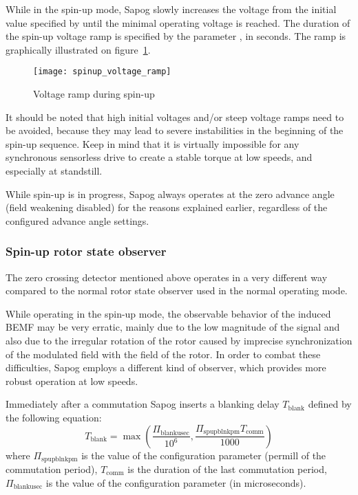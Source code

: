 \documentclass{zubaxdoc}
\begin{document}
	While in the spin-up mode, Sapog slowly increases the voltage from the initial value specified
	by  until the minimal operating voltage  is reached.
	The duration of the spin-up voltage ramp is specified by the parameter ,
	in seconds.
	The ramp is graphically illustrated on figure~\ref{spinup_voltage_ramp}.
	
	\begin{figure}[hbt]
		\centering
		\texttt{[image: spinup\_voltage\_ramp]}
		\caption{Voltage ramp during spin-up
			\label{spinup_voltage_ramp}}
	\end{figure}
	
	It should be noted that high initial voltages and/or steep voltage ramps need to be avoided,
	because they may lead to severe instabilities in the beginning of the spin-up sequence.
	Keep in mind that it is virtually impossible for any synchronous sensorless drive to create a stable
	torque at low speeds, and especially at standstill.
	
	While spin-up is in progress, Sapog always operates at the zero advance angle
	(field weakening disabled) for the reasons explained earlier,
	regardless of the configured advance angle settings.
	
	\subsubsection{Spin-up rotor state observer}
	
	The zero crossing detector mentioned above operates in a very different way compared to the
	normal rotor state observer used in the normal operating mode.
	
	While operating in the spin-up mode, the observable behavior of the induced BEMF may be very erratic,
	mainly due to the low magnitude of the signal and also due to the irregular rotation of the rotor caused by
	imprecise synchronization of the modulated field with the field of the rotor.
	In order to combat these difficulties, Sapog employs a different kind of observer, which provides
	more robust operation at low speeds.
	
	Immediately after a commutation Sapog inserts a blanking delay $T_\text{blank}$
	defined by the following equation:
	\begin{equation}
		T_{\text{blank}}=
		\max \left(\frac{\Pi_{\text{blankusec}}}{10^6},
		\frac{\Pi_{\text{spupblnkpm}} T_{\text{comm}}}{1000}\right)
	\end{equation}
	where $\Pi_{\text{spupblnkpm}}$ is the value of the configuration parameter 
	(permill of the commutation period),
	$T_{\text{comm}}$ is the duration of the last commutation period,
	$\Pi_{\text{blankusec}}$ is the value of the configuration parameter 
	(in microseconds).
	
\end{document}
